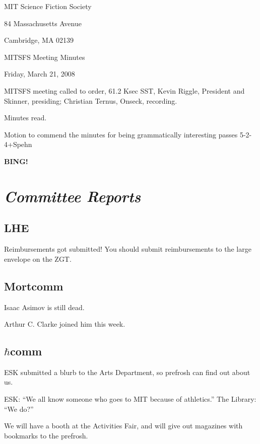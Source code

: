 \documentclass[10pt]{article}
\newcommand{\bing}{{\bf BING!} }
\newcommand{\goto}[1]{\bing \vskip 12pt \section*{{\em{#1}}}}
\begin{document}
\begin{center}

MIT Science Fiction Society

84 Massachusetts Avenue

Cambridge, MA 02139

\vspace{12pt}

MITSFS Meeting Minutes

Friday, March 21, 2008

\end{center}

\vspace{18pt}

\setlength{\parskip}{6pt}

\noindent
MITSFS meeting called to order, 61.2 Ksec SST,
Kevin Riggle, President and Skinner, presiding; Christian Ternus, Onseck, recording.

Minutes read.

Motion to commend the minutes for being grammatically interesting passes 5-2-4+Spehn

\BING

\goto{Committee Reports}

\subsection*{LHE}

Reimbursements got submitted!  You should submit reimbursements to the
large envelope on the ZGT.

\subsection*{Mortcomm}

Isaac Asimov is still dead.

Arthur C. Clarke joined him this week.

\subsection*{$\hbar$comm}

ESK submitted a blurb to the Arts Department, so prefrosh can find out
about us.

ESK: ``We all know someone who goes to MIT because of athletics.''
The Library: ``We do?''

We will have a booth at the Activities Fair, and will give out
magazines with bookmarks to the prefrosh.
\end{document}
